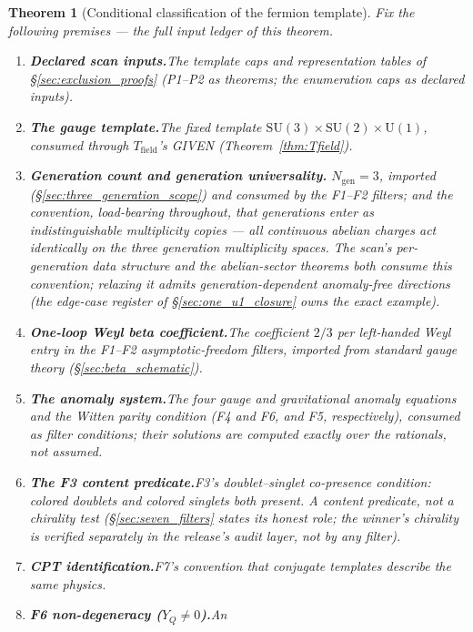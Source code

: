 \documentclass[11pt]{article}
\newtheorem{theorem}{Theorem}[section]
\theoremstyle{definition}
\newcommand{\SU}{\mathrm{SU}}
\newcommand{\U}{\mathrm{U}}
\begin{document}
\begin{theorem}[Conditional classification of the fermion template]
\label{thm:conditional_classification}
Fix the following premises --- the full input ledger of this theorem.
\begin{enumerate}[label=(C\arabic*),nosep]
  \item \textbf{Declared scan inputs.}\quad The template caps and
  representation tables of \S\ref{sec:exclusion_proofs} (P1--P2 as
  theorems; the enumeration caps as declared inputs).
  \item \textbf{The gauge template.}\quad The fixed template
  $\SU(3)\times\SU(2)\times\U(1)$, consumed through
  $T_{\mathrm{field}}$'s GIVEN (Theorem~\ref{thm:Tfield}).
  \item \textbf{Generation count and generation universality.}\quad
  $N_{\mathrm{gen}} = 3$, imported
  (\S\ref{sec:three_generation_scope}) and consumed by the F1--F2
  filters; and the convention, load-bearing throughout, that
  generations enter as indistinguishable multiplicity copies ---
  \emph{all continuous abelian charges act identically on the three
  generation multiplicity spaces}.  The scan's per-generation data
  structure and the abelian-sector theorems both consume this
  convention; relaxing it admits generation-dependent anomaly-free
  directions (the edge-case register of \S\ref{sec:one_u1_closure}
  owns the exact example).
  \item \textbf{One-loop Weyl beta coefficient.}\quad The
  coefficient $2/3$ per left-handed Weyl entry in the F1--F2
  asymptotic-freedom filters, imported from standard gauge theory
  (\S\ref{sec:beta_schematic}).
  \item \textbf{The anomaly system.}\quad The four gauge and
  gravitational anomaly equations and the Witten parity condition
  (F4 and F6, and F5, respectively), consumed as filter conditions; their solutions are
  computed exactly over the rationals, not assumed.
  \item \textbf{The F3 content predicate.}\quad F3's
  doublet--singlet co-presence condition: colored doublets and
  colored singlets both present.  A content predicate, not a
  chirality test (\S\ref{sec:seven_filters} states its honest role;
  the winner's chirality is verified separately in the release's
  audit layer, not by any filter).
  \item \textbf{CPT identification.}\quad F7's convention that
  conjugate templates describe the same physics.
  \item \textbf{F6 non-degeneracy ($Y_Q \neq 0$).}\quad An

\end{enumerate}
\end{theorem}
\end{document}
